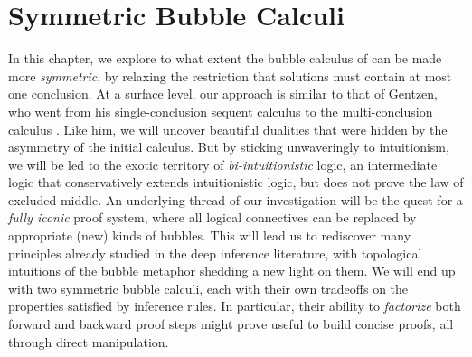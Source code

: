 \setchapterpreamble[u]{\margintoc}
\chapter{Symmetric Bubble Calculi}

In this chapter, we explore to what extent the bubble calculus of
 can be made more \emph{symmetric}, by relaxing the restriction
that solutions must contain at most one conclusion. At a surface level, our
approach is similar to that of Gentzen, who went from his single-conclusion
sequent calculus  to the multi-conclusion calculus . Like him,
we will uncover beautiful dualities that were hidden by the asymmetry of the
initial calculus. But by sticking unwaveringly to intuitionism, we will be led
to the exotic territory of \emph{bi-intuitionistic} logic, an intermediate logic
that conservatively extends intuitionistic logic, but does not prove the law of
excluded middle. An underlying thread of our investigation will be the quest for
a \emph{fully iconic} proof system, where all logical connectives can be
replaced by appropriate (new) kinds of bubbles. This will lead us to rediscover
many principles already studied in the deep inference literature, with
topological intuitions of the bubble metaphor shedding a new light on them. We
will end up with two symmetric bubble calculi, each with their own tradeoffs on
the properties satisfied by inference rules. In particular, their ability to
\emph{factorize} both forward and backward proof steps might prove useful to
build concise proofs, all through direct manipulation.

